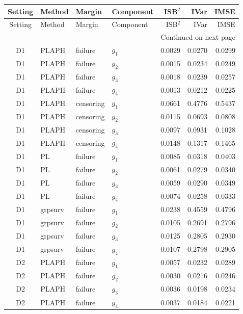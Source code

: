 \begin{longtable}{clllrrr}

\label{tab:e10-function-component}\\
\toprule
Setting & Method & Margin & Component & ISB$^2$ & IVar & IMSE \\
\midrule
\endfirsthead
\toprule
Setting & Method & Margin & Component & ISB$^2$ & IVar & IMSE \\
\midrule
\endhead
\midrule
\multicolumn{7}{r}{Continued on next page} \\
\endfoot
\bottomrule
\endlastfoot
D1 & PLAPH & failure & $g_{1}$ & 0.0029 & 0.0270 & 0.0299 \\
D1 & PLAPH & failure & $g_{2}$ & 0.0015 & 0.0234 & 0.0249 \\
D1 & PLAPH & failure & $g_{3}$ & 0.0018 & 0.0239 & 0.0257 \\
D1 & PLAPH & failure & $g_{4}$ & 0.0013 & 0.0212 & 0.0225 \\
D1 & PLAPH & censoring & $g_{1}$ & 0.0661 & 0.4776 & 0.5437 \\
D1 & PLAPH & censoring & $g_{2}$ & 0.0115 & 0.0693 & 0.0808 \\
D1 & PLAPH & censoring & $g_{3}$ & 0.0097 & 0.0931 & 0.1028 \\
D1 & PLAPH & censoring & $g_{4}$ & 0.0148 & 0.1317 & 0.1465 \\
D1 & PL & failure & $g_{1}$ & 0.0085 & 0.0318 & 0.0403 \\
D1 & PL & failure & $g_{2}$ & 0.0061 & 0.0279 & 0.0340 \\
D1 & PL & failure & $g_{3}$ & 0.0059 & 0.0290 & 0.0349 \\
D1 & PL & failure & $g_{4}$ & 0.0074 & 0.0258 & 0.0333 \\
D1 & grpsurv & failure & $g_{1}$ & 0.0238 & 0.4559 & 0.4796 \\
D1 & grpsurv & failure & $g_{2}$ & 0.0105 & 0.2691 & 0.2796 \\
D1 & grpsurv & failure & $g_{3}$ & 0.0125 & 0.2805 & 0.2930 \\
D1 & grpsurv & failure & $g_{4}$ & 0.0107 & 0.2798 & 0.2905 \\
D2 & PLAPH & failure & $g_{1}$ & 0.0057 & 0.0232 & 0.0289 \\
D2 & PLAPH & failure & $g_{2}$ & 0.0030 & 0.0216 & 0.0246 \\
D2 & PLAPH & failure & $g_{3}$ & 0.0036 & 0.0198 & 0.0234 \\
D2 & PLAPH & failure & $g_{4}$ & 0.0037 & 0.0184 & 0.0221 \\

\end{longtable}
